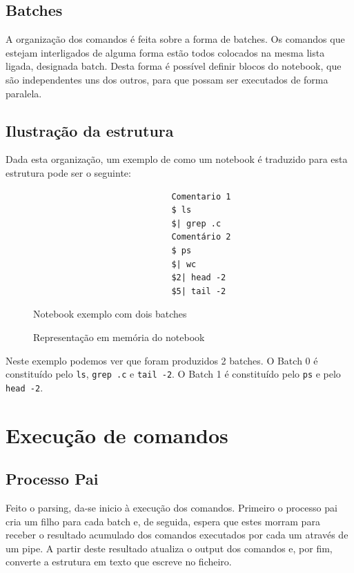 \documentclass[12pt,a4paper]{report}
\begin{document}
    \section{Batches}
        A organização dos comandos é feita sobre a forma de batches. Os comandos
        que estejam interligados de alguma forma estão todos colocados na mesma
        lista ligada, designada batch. Desta forma é possível definir blocos do
        notebook, que são independentes uns dos outros, para que possam ser
        executados de forma paralela.

    \section{Ilustração da estrutura}
        Dada esta organização, um exemplo de como um notebook é traduzido para
        esta estrutura pode ser o seguinte:

        \begin{figure}[H]
            \begin{verbatim}
                            Comentario 1
                            $ ls
                            $| grep .c
                            Comentário 2
                            $ ps
                            $| wc
                            $2| head -2
                            $5| tail -2
            \end{verbatim}
            \caption{Notebook exemplo com dois batches}
        \end{figure}
        \begin{figure}[H]
            \centering
            
            \caption{Representação em memória do notebook}
        \end{figure}

        Neste exemplo podemos ver que foram produzidos 2 batches. O Batch 0 é
        constituído pelo \texttt{ls}, \texttt{grep .c} e
        \texttt{tail -2}. O Batch 1 é constituído pelo
        \texttt{ps} e pelo \texttt{head -2}.

\chapter{Execução de comandos}

    \section{Processo Pai}
        Feito o parsing, da-se inicio à execução dos comandos. Primeiro o
        processo pai cria um filho para cada batch e, de seguida, espera que
        estes morram para receber o resultado acumulado dos comandos
        executados por cada um através de um pipe. A partir deste resultado
        atualiza o output dos comandos e, por fim, converte a estrutura em
        texto que escreve no ficheiro.
\end{document}
